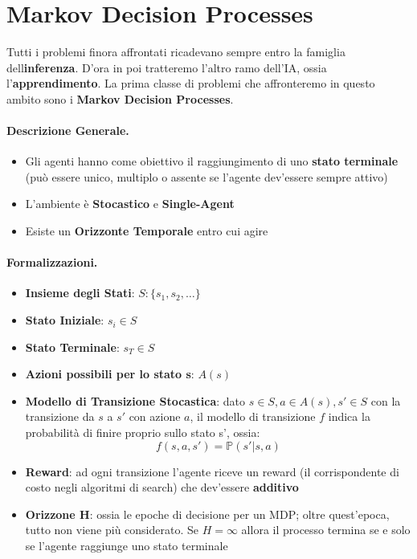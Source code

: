 \section{Markov Decision Processes}
Tutti i problemi finora affrontati ricadevano sempre entro la famiglia dell\textbf{inferenza}. D'ora in poi tratteremo l'altro
ramo dell'IA, ossia l'\textbf{apprendimento}.
La prima classe di problemi che affronteremo in questo ambito sono i \textbf{Markov Decision Processes}.
\paragraph{Descrizione Generale.}
\begin{itemize}
    \item Gli agenti hanno come obiettivo il raggiungimento di uno \textbf{stato terminale} (può essere unico, multiplo o assente se l'agente dev'essere sempre attivo)
    \item L'ambiente è \textbf{Stocastico} e \textbf{Single-Agent}
    \item Esiste un \textbf{Orizzonte Temporale} entro cui agire
\end{itemize}
\paragraph{Formalizzazioni.}
\begin{itemize}
    \item \textbf{Insieme degli Stati}: $S : \{s_1, s_2, \dots\}$
    \item \textbf{Stato Iniziale}: $s_i \in S$
    \item \textbf{Stato Terminale}: $s_T \in S$
    \item \textbf{Azioni possibili per lo stato s}: $A(s)$
    \item \textbf{Modello di Transizione Stocastica}: dato $s \in S, a \in A(s), s' \in S$ con la transizione da $s$ a $s'$ con azione $a$,
    il modello di transizione $f$ indica la probabilità di finire proprio sullo stato s', ossia:
    \begin{equation}
        f(s,a,s') =  \mathbb{P}(s' | s,a)
    \end{equation} 
    \item \textbf{Reward}: ad ogni transizione l'agente riceve un reward (il corrispondente di costo negli algoritmi di search) che 
    dev'essere \textbf{additivo}
    \item \textbf{Orizzone H}: ossia le epoche di decisione per un MDP; oltre quest'epoca, tutto non viene più considerato. Se $H = \infty$ allora
    il processo termina se e solo se l'agente raggiunge uno stato terminale
\end{itemize}

